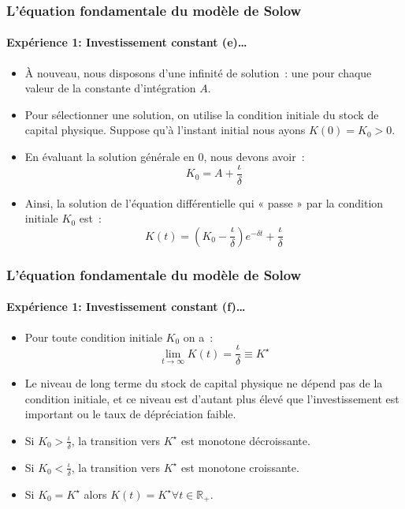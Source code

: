 \documentclass[10pt,notheorems]{beamer}
\theoremstyle{plain}
\theoremstyle{definition} %
\begin{document}
\begin{frame}
  \frametitle{L'équation fondamentale du modèle de Solow}
  \framesubtitle{Expérience 1: Investissement constant (e)\ldots}

  \bigskip

  \begin{itemize}

  \item À nouveau, nous disposons d'une infinité de solution~: une pour chaque valeur de la constante d'intégration $A$.\newline

  \item Pour sélectionner une solution, on utilise la condition initiale du stock de capital physique. Suppose qu'à l'instant initial nous ayons $K(0)=K_0>0$.\newline

  \item En évaluant la solution générale en 0, nous devons avoir~:
    \[
      K_0 = A + \frac{\iota}{\delta}
    \]

  \item Ainsi, la solution de l'équation différentielle qui « passe » par la condition initiale $K_0$ est~:
    \[
      K(t) = \left(K_0-\frac{\iota}{\delta}\right)e^{-\delta t} + \frac{\iota}{\delta}
    \]
  \end{itemize}

\end{frame}


\begin{frame}
  \frametitle{L'équation fondamentale du modèle de Solow}
  \framesubtitle{Expérience 1: Investissement constant (f)\ldots}

  \bigskip

  \begin{itemize}

  \item Pour toute condition initiale $K_0$ on a~:
    \[
      \lim_{t\rightarrow\infty} K(t) = \frac{\iota}{\delta} \equiv K^{\star}
    \]

  \item Le niveau de long terme du stock de capital physique ne dépend pas de la condition initiale, et ce niveau est d'autant plus élevé que l'investissement est important ou le taux de dépréciation faible.\newline

  \item Si $K_0>\frac{\iota}{\delta}$, la transition vers $K^{\star}$ est monotone décroissante.\newline
  \item Si $K_0<\frac{\iota}{\delta}$, la transition vers $K^{\star}$ est monotone croissante.\newline

  \item Si $K_0 = K^{\star}$ alors $K(t)=K^{\star}\forall t\in\mathbb R_+$.
  \end{itemize}

\end{frame}
\end{document}
